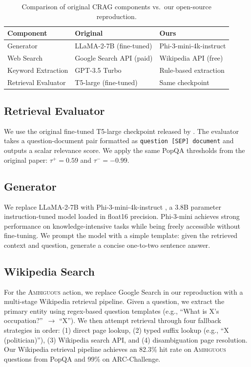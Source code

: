 \documentclass[11pt]{article}
\begin{document}
\begin{table}[H]
\centering
\begin{tabular}{lll}
\toprule
\textbf{Component} & \textbf{Original} & \textbf{Ours} \\
\midrule
Generator           & LLaMA-2-7B (fine-tuned)    & Phi-3-mini-4k-instruct \\
Web Search          & Google Search API (paid)   & Wikipedia API (free) \\
Keyword Extraction  & GPT-3.5 Turbo              & Rule-based extraction \\
Retrieval Evaluator & T5-large (fine-tuned)      & Same checkpoint \\
\bottomrule
\end{tabular}
\caption{Comparison of original CRAG components vs.\ our open-source reproduction.}
\label{tab:components}
\end{table}

\subsection{Retrieval Evaluator}
We use the original fine-tuned T5-large checkpoint released by \cite{yan2024corrective}. The
evaluator takes a question-document pair formatted as \texttt{question [SEP] document} and outputs
a scalar relevance score. We apply the same PopQA thresholds from the original paper:
$\tau^+ = 0.59$ and $\tau^- = -0.99$.

\subsection{Generator}
We replace LLaMA-2-7B with Phi-3-mini-4k-instruct \cite{abdin2024phi3}, a 3.8B parameter
instruction-tuned model loaded in float16 precision. Phi-3-mini achieves strong performance on
knowledge-intensive tasks while being freely accessible without fine-tuning. We prompt the model
with a simple template: given the retrieved context and question, generate a concise one-to-two
sentence answer.

\subsection{Wikipedia Search}
For the \textsc{Ambiguous} action, we replace Google Search in our reproduction with a multi-stage
Wikipedia retrieval pipeline. Given a question, we extract the primary entity using regex-based
question templates (e.g., ``What is X's occupation?''\ $\rightarrow$ ``X''). We then attempt
retrieval through four fallback strategies in order: (1) direct page lookup, (2) typed suffix
lookup (e.g., ``X (politician)''), (3) Wikipedia search API, and (4) disambiguation page
resolution. Our Wikipedia retrieval pipeline achieves an 82.3\% hit rate on \textsc{Ambiguous}
questions from PopQA and 99\% on ARC-Challenge.
\end{document}
